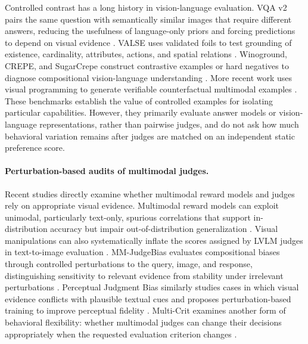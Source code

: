 Controlled contrast has a long history in vision-language evaluation. VQA v2 pairs the same question with semantically similar images that require different answers, reducing the usefulness of language-only priors and forcing predictions to depend on visual evidence \citep{goyal2017making}. VALSE uses validated foils to test grounding of existence, cardinality, attributes, actions, and spatial relations \citep{parcalabescu2022valse}. Winoground, CREPE, and SugarCrepe construct contrastive examples or hard negatives to diagnose compositional vision-language understanding \citep{thrush2022winoground,ma2023crepe,hsieh2023sugarcrepe}. More recent work uses visual programming to generate verifiable counterfactual multimodal examples \citep{gao2025counterfactual}. These benchmarks establish the value of controlled examples for isolating particular capabilities. However, they primarily evaluate answer models or vision-language representations, rather than pairwise judges, and do not ask how much behavioral variation remains after judges are matched on an independent static preference score.

\paragraph{Perturbation-based audits of multimodal judges.}
Recent studies directly examine whether multimodal reward models and judges rely on appropriate visual evidence. Multimodal reward models can exploit unimodal, particularly text-only, spurious correlations that support in-distribution accuracy but impair out-of-distribution generalization \citep{li2025devil}. Visual manipulations can also systematically inflate the scores assigned by LVLM judges in text-to-image evaluation \citep{hwang2025fooling}. MM-JudgeBias evaluates compositional biases through controlled perturbations to the query, image, and response, distinguishing sensitivity to relevant evidence from stability under irrelevant perturbations \citep{lee2026mmjudgebias}. Perceptual Judgment Bias similarly studies cases in which visual evidence conflicts with plausible textual cues and proposes perturbation-based training to improve perceptual fidelity \citep{park2026mitigating}. Multi-Crit examines another form of behavioral flexibility: whether multimodal judges can change their decisions appropriately when the requested evaluation criterion changes \citep{xiong2026multicrit}.

